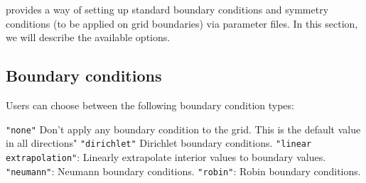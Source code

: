 \CarpetX\space provides a way of setting up standard boundary conditions and symmetry conditions (to be applied on grid boundaries) via parameter files. In this section, we will describe the available options.

\subsection{Boundary conditions}

Users can choose between the following boundary condition types:

\begin{enumerate}
    \texttt{"none"}\: Don't apply any boundary condition to the grid. This is the default value in all directions"
    \texttt{"dirichlet"}\: Dirichlet boundary conditions.
    \texttt{"linear extrapolation"}: Linearly extrapolate interior values to boundary values.
    \texttt{"neumann"}: Neumann boundary conditions.
    \texttt{"robin"}: Robin boundary conditions.
\end{enumerate}

